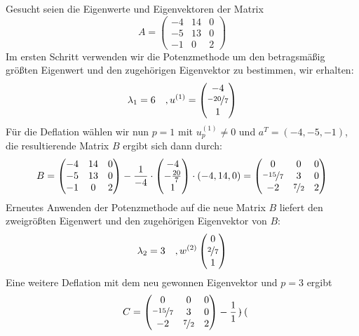 \begin{egbox}
    Gesucht seien die Eigenwerte und Eigenvektoren der Matrix
    \[A = \begin{pmatrix}
        -4 & 14 & 0 \\ -5 & 13 & 0 \\ -1 & 0 & 2
    \end{pmatrix}\]
    Im ersten Schritt verwenden wir die Potenzmethode um den betragsmäßig größten Eigenwert und den zugehörigen
    Eigenvektor zu bestimmen, wir erhalten:
    \[
    \lambda_1=6 \quad, u^{(1)}=\begin{pmatrix}
            -4 \\ \nicefrac{-20}{7} \\ 1
        \end{pmatrix}
    \]
    Für die Deflation wählen wir nun $p=1$ mit $u_p^{(1)}\neq 0$ und $a^T=(-4, -5, -1)$, die resultierende Matrix $B$
    ergibt sich dann durch:
    \[
    B = \begin{pmatrix}
        -4 & 14 & 0 \\ -5 & 13 & 0 \\ -1 & 0 & 2
    \end{pmatrix} - \dfrac{1}{-4}\cdot\begin{pmatrix}
        -4 \\ -\tfrac{20}{7} \\ 1
    \end{pmatrix}\cdot(-4, 14, 0) = \begin{pmatrix}
        0 & 0 & 0 \\ \nicefrac{-15}{7} & 3 & 0 \\ -2 & \nicefrac{7}{2} & 2
    \end{pmatrix}
    \]
    Erneutes Anwenden der Potenzmethode auf die neue Matrix $B$ liefert den zweigrößten Eigenwert und den
    zugehörigen Eigenvektor von $B$:
    \[
        \lambda_2=3 \quad, w^{(2)}\begin{pmatrix}
            0 \\ \nicefrac{2}{7} \\ 1
        \end{pmatrix}
    \]
    Eine weitere Deflation mit dem neu gewonnen Eigenvektor und $p=3$ ergibt
    \[
        C = \begin{pmatrix}
        0 & 0 & 0 \\ \nicefrac{-15}{7} & 3 & 0 \\ -2 & \nicefrac{7}{2} & 2
    \end{pmatrix} - \dfrac{1}{1}\cdot \begin{pmatrix}

\end{pmatrix}\]
\end{egbox}
